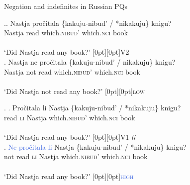 \documentclass[xcolor=dvipsnames]{beamer}
\newcommand{\rcommentg}[1]{\hfill\raisebox{1.9\baselineskip}[0pt][0pt]{#1}}
\begin{document}
\begin{frame}{Negation and indefinites in Russian PQs}
    \begin{scriptsize}
        \cite{Brown1995, Abels2005, Zanon2023}
    \end{scriptsize}

    \begin{small}
        \ex.\ag. Nastja pročitala \{kakuju-nibud' / *nikakuju\} knigu? \\
        Nastja read which.\textsc{nibud'}  {} which.\textsc{nci} book \\\\
        `Did Nastja read any book?' \rcommentg{V2} \\
        \vspace{.5em}
        \bg. Nastja \textcolor{WildStrawberry}{ne} \textcolor{WildStrawberry}{pročitala} \{kakuju-nibud' / nikakuju\} knigu? \\
        Nastja not read which.\textsc{nibud'}  {} which.\textsc{nci} book \\\\
        `Did Nastja not read any book?' \rcommentg{\textcolor{WildStrawberry}{\textsc{low}}} \\
        \par
    \end{small}
    \pause 
    \begin{small}
        \ex. \ag. Pročitala li Nastja \{kakuju-nibud' / *nikakuju\} knigu? \\
        read \textsc{li} Nastja which.\textsc{nibud'}  {} which.\textsc{nci} book \\\\
        `Did Nastja read any book?' \rcommentg{V1 \textit{li}} \\
        \vspace{.5em}
        \bg. \textcolor{RoyalBlue}{Ne} \textcolor{RoyalBlue}{pročitala} \textcolor{RoyalBlue}{li} Nastja \{kakuju-nibud' / *nikakuju\} knigu? \\
        not read \textsc{li} Nastja which.\textsc{nibud'}  {} which.\textsc{nci} book \\\\
        `Did Nastja read any book?' \rcommentg{\textcolor{RoyalBlue}{\textsc{high}}}  \\ 
        \par  
    \end{small}
\end{frame}
\end{document}
